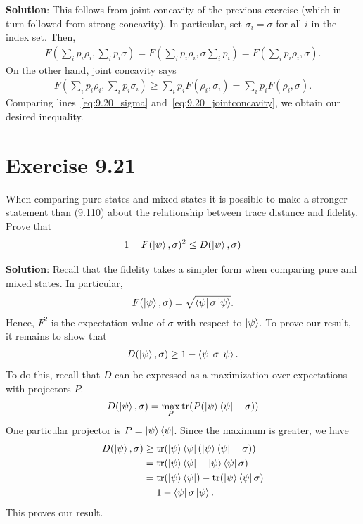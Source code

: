 \documentclass{book}
\begin{document}
    \textbf{Solution}: This follows from joint concavity of the previous exercise (which in turn followed from strong concavity). In particular, set $\sigma_i = \sigma$ for all $i$ in the index set. Then, 
    \begin{align} \label{eq:9.20_sigma}
        F\left(\sum_i p_i \rho_i, \sum_i p_i \sigma\right) = F\left(\sum_i p_i \rho_i, \sigma \sum_i p_i \right) = F\left(\sum_i p_i \rho_i, \sigma\right).
    \end{align}
    On the other hand, joint concavity says
    \begin{align}\label{eq:9.20_jointconcavity}
        F\left(\sum_i p_i \rho_i, \sum_i p_i \sigma_i\right)  \geq \sum_i p_i F(\rho_i, \sigma_i) = \sum_i p_i F(\rho_i, \sigma).
    \end{align}
    Comparing lines~\eqref{eq:9.20_sigma} and~\eqref{eq:9.20_jointconcavity}, we obtain our desired inequality. 

\section*{Exercise 9.21}
    When comparing pure states and mixed states it is possible to make a stronger statement than (9.110) about the relationship between trace distance and fidelity. Prove that
    \begin{align}
        1 - F(\ket{\psi}, \sigma)^2 \leq D(\ket{\psi},\sigma)
    \end{align}

    \textbf{Solution}: Recall that the fidelity takes a simpler form when comparing pure and mixed states. In particular,
    \begin{align}
        F(\ket{\psi},\sigma) = \sqrt{\bra{\psi}\sigma\ket{\psi}}.
    \end{align}
    Hence, $F^2$ is the expectation value of $\sigma$ with respect to $\ket{\psi}$. To prove our result, it remains to show that
    \begin{align}
        D(\ket{\psi}, \sigma) \geq 1 - \bra{\psi}\sigma \ket{\psi}.
    \end{align}
    To do this, recall that $D$ can be expressed as a maximization over expectations with projectors $P$.
    \begin{align}
        D(\ket{\psi},\sigma) = \max_P \tr(P (\ket{\psi}\bra{\psi}-\sigma))
    \end{align}
    One particular projector is $P = \ket{\psi}\bra{\psi}$. Since the maximum is greater, we have
    \begin{align}
    \begin{aligned}
        D(\ket{\psi}, \sigma) &\geq \tr(\ket{\psi}\bra{\psi}(\ket{\psi}\bra{\psi}-\sigma)) \\
        &= \tr(\ket{\psi}\bra{\psi} - \ket{\psi}\bra{\psi} \sigma) \\
        &= \tr(\ket{\psi}\bra{\psi}) - \tr(\ket{\psi}\bra{\psi} \sigma)\\
        &= 1 - \bra{\psi}\sigma \ket{\psi}.
    \end{aligned}
    \end{align}
    This proves our result.
\end{document}
